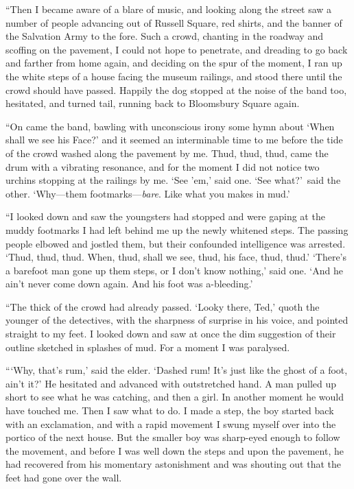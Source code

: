 “Then I became aware of a blare of music, and looking along the street saw a number of people advancing out of Russell Square, red shirts, and the banner of the Salvation Army to the fore. Such a crowd, chanting in the roadway and scoffing on the pavement, I could not hope to penetrate, and dreading to go back and farther from home again, and deciding on the spur of the moment, I ran up the white steps of a house facing the museum railings, and stood there until the crowd should have passed. Happily the dog stopped at the noise of the band too, hesitated, and turned tail, running back to Bloomsbury Square again.

“On came the band, bawling with unconscious irony some hymn about ‘When shall we see his Face?’ and it seemed an interminable time to me before the tide of the crowd washed along the pavement by me. Thud, thud, thud, came the drum with a vibrating resonance, and for the moment I did not notice two urchins stopping at the railings by me. ‘See ’em,’ said one. ‘See what?’\ said the other. ‘Why—them footmarks—\emph{bare}. Like what you makes in mud.’

“I looked down and saw the youngsters had stopped and were gaping at the muddy footmarks I had left behind me up the newly whitened steps. The passing people elbowed and jostled them, but their confounded intelligence was arrested. ‘Thud, thud, thud. When, thud, shall we see, thud, his face, thud, thud.’ ‘There’s a barefoot man gone up them steps, or I don’t know nothing,’ said one. ‘And he ain’t never come down again. And his foot was a-bleeding.’

“The thick of the crowd had already passed. ‘Looky there, Ted,’ quoth the younger of the detectives, with the sharpness of surprise in his voice, and pointed straight to my feet. I looked down and saw at once the dim suggestion of their outline sketched in splashes of mud. For a moment I was paralysed.

“\kern1pt‘Why, that’s rum,’ said the elder. ‘Dashed rum! It’s just like the ghost of a foot, ain’t it?’ He hesitated and advanced with outstretched hand. A man pulled up short to see what he was catching, and then a girl. In another moment he would have touched me. Then I saw what to do. I made a step, the boy started back with an exclamation, and with a rapid movement I swung myself over into the portico of the next house. But the smaller boy was sharp-eyed enough to follow the movement, and before I was well down the steps and upon the pavement, he had recovered from his momentary astonishment and was shouting out that the feet had gone over the wall.

